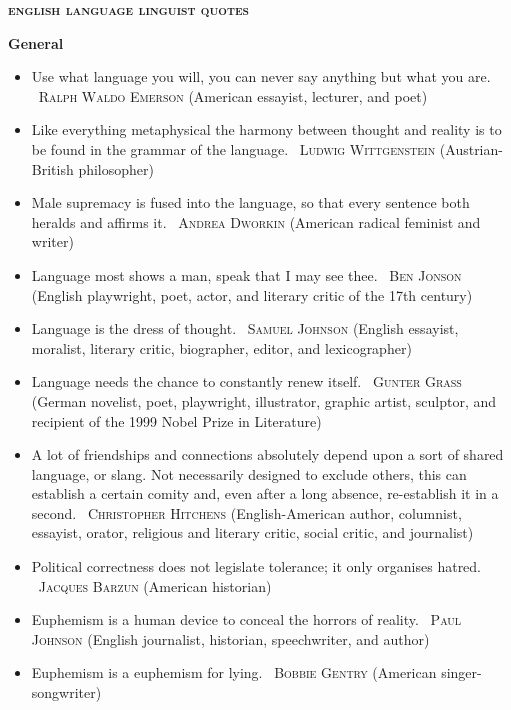\documentclass[a4paper]{article}
\newcommand{\heading}[1]{\textbf{#1}}
\newcommand{\linguist}[1]{\textemdash~\textsc{#1}}
\begin{document}
\begin{center}
  \Large \bfseries \scshape english language linguist quotes \normalsize \normalfont {}
\end{center}
\begin{multicols}{2}
  \heading{General}
  \begin{itemize}
    \item Use what language you will, you can never say anything but what you are. \linguist{Ralph Waldo Emerson} (American essayist, lecturer, and poet)
    \item Like everything metaphysical the harmony between thought and reality is to be found in the grammar of the language. \linguist{Ludwig Wittgenstein} (Austrian-British philosopher)
    \item Male supremacy is fused into the language, so that every sentence both heralds and affirms it. \linguist{Andrea Dworkin} (American radical feminist and writer)
    \item Language most shows a man, speak that I may see thee. \linguist{Ben Jonson} (English playwright, poet, actor, and literary critic of the 17th century)
    \item Language is the dress of thought. \linguist{Samuel Johnson} (English essayist, moralist, literary critic, biographer, editor, and lexicographer)
    \item Language needs the chance to constantly renew itself. \linguist{Gunter Grass} (German novelist, poet, playwright, illustrator, graphic artist, sculptor, and recipient of the 1999 Nobel Prize in Literature)
    \item A lot of friendships and connections absolutely depend upon a sort of shared language, or slang. Not necessarily designed to exclude others, this can establish a certain comity and, even after a long absence, re-establish it in a second. \linguist{Christopher Hitchens} (English-American author, columnist, essayist, orator, religious and literary critic, social critic, and journalist)
    \item Political correctness does not legislate tolerance; it only organises hatred. \linguist{Jacques Barzun} (American historian)
    \item Euphemism is a human device to conceal the horrors of reality. \linguist{Paul Johnson} (English journalist, historian, speechwriter, and author)
    \item Euphemism is a euphemism for lying. \linguist{Bobbie Gentry} (American singer-songwriter)

\end{itemize}
\end{multicols}
\end{document}
